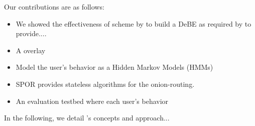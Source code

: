 Our contributions are as follows: 
\begin{itemize}
\item We showed the effectiveness of  scheme by \textcite{ANOBE} 
  to build a \ac{DeBE} as required by \name to
  provide.... 
\item A \squad overlay 
\item Model the user’s behavior as a Hidden Markov Models (HMMs)
\item SPOR provides stateless algorithms for the onion-routing.
\item An evaluation testbed where each user’s behavior
\end{itemize}

In the following, we detail \name 's concepts and approach...

